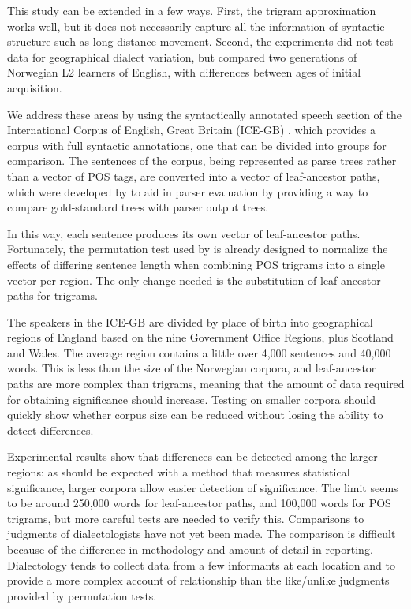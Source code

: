 \documentclass[11pt,letterpaper]{article}
\begin{document}
This study can be extended in a few ways.
First, the trigram approximation works well, but it
does not necessarily capture all the information of syntactic
structure such as long-distance movement. Second,
the experiments did not test data for geographical dialect variation,
but compared two generations of Norwegian L2 learners of English, with
differences between ages of initial acquisition.

We address these areas by using the syntactically annotated speech
section of the International Corpus of English, Great Britain (ICE-GB)
\cite{nelson02}, which provides a corpus with full syntactic annotations,
one that can be divided into groups for comparison. The sentences
of the corpus, being represented as parse trees rather than a vector
of POS tags, are
converted into a vector of leaf-ancestor paths, which were developed
by  to aid in parser evaluation by providing a way to
compare gold-standard trees with parser output trees.

In this way, each sentence produces its own vector of leaf-ancestor
paths. Fortunately, the
permutation test used by  is already designed to
normalize the effects of differing sentence length when combining POS
trigrams into a single vector per region. The only change needed is
the substitution of leaf-ancestor paths for trigrams.

The speakers in the ICE-GB are divided by place of birth into
geographical regions of
England based on the nine Government Office Regions, plus Scotland and
Wales. The
average region contains a little over 4,000
sentences and 40,000 words. This is less than the size of the
Norwegian corpora, and leaf-ancestor paths are more
complex than trigrams, meaning that the amount of data required for
obtaining significance should increase. Testing on smaller corpora
should quickly show whether corpus size can be reduced without losing
the ability to detect differences.

Experimental results show that differences can be detected among the
larger regions: as should be expected with a method
that measures statistical significance, larger corpora allow easier
detection of significance. The limit seems to be around 250,000 words for
leaf-ancestor paths, and 100,000 words for POS trigrams, but more careful
tests are needed to verify this.
Comparisons to judgments of dialectologists have not yet
been made. The comparison is difficult because of the
difference in methodology and amount of detail in
reporting. Dialectology tends to collect data from a few informants
at each location and to provide a more complex account of relationship
than the like/unlike judgments provided by permutation tests.
\end{document}
